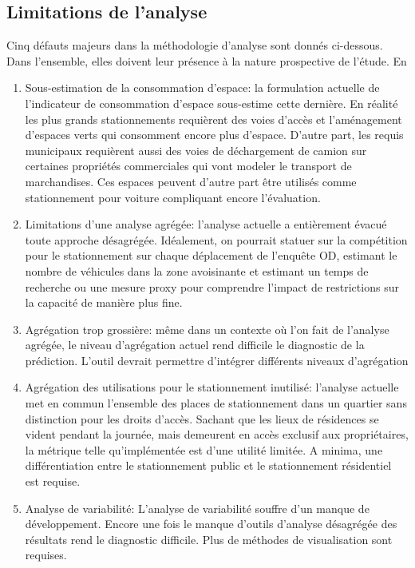     \subsection{Limitations de l'analyse}    
        Cinq défauts majeurs dans la méthodologie d'analyse sont donnés ci-dessous. Dans l'ensemble, elles doivent leur présence à la nature prospective de l'étude. En
        \begin{enumerate}
            \item Sous-estimation de la consommation d'espace: la formulation actuelle de l'indicateur de consommation d'espace sous-estime cette dernière. En réalité les plus grands stationnements requièrent des voies d'accès et l'aménagement d'espaces verts qui consomment encore plus d'espace. D'autre part, les requis municipaux requièrent aussi des voies de déchargement de camion sur certaines propriétés commerciales qui vont modeler le transport de marchandises. Ces espaces peuvent d'autre part être utilisés comme stationnement pour voiture compliquant encore l'évaluation.
            \item Limitations d'une analyse agrégée: l'analyse actuelle a entièrement évacué toute approche désagrégée. Idéalement, on pourrait statuer sur la compétition pour le stationnement sur chaque déplacement de l'enquête OD, estimant le nombre de véhicules dans la zone avoisinante et estimant un temps de recherche ou une mesure proxy pour comprendre l'impact de restrictions sur la capacité de manière plus fine.
            \item Agrégation trop grossière: même dans un contexte où l'on fait de l'analyse agrégée, le niveau d'agrégation actuel rend difficile le diagnostic de la prédiction. L'outil devrait permettre d'intégrer différents niveaux d'agrégation
            \item Agrégation des utilisations pour le stationnement inutilisé: l'analyse actuelle met en commun l'ensemble des places de stationnement dans un quartier sans distinction pour les droits d'accès. Sachant que les lieux de résidences se vident pendant la journée, mais demeurent en accès exclusif aux propriétaires, la métrique telle qu'implémentée est d'une utilité limitée. A minima, une différentiation entre le stationnement public et le stationnement résidentiel est requise. 
            \item Analyse de variabilité: L'analyse de variabilité souffre d'un manque de développement. Encore une fois le manque d'outils d'analyse désagrégée des résultats rend le diagnostic difficile. Plus de méthodes de visualisation sont requises.
        \end{enumerate}
